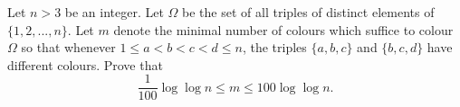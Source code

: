 \documentclass{article}
\begin{document}
\setlength{\parindent}{0pt}
Let $n > 3$ be an integer. Let $\Omega$ be the set of all triples of distinct elements of $\{1, 2, . . . , n\}$. Let $m$ denote the minimal number of colours which suffice to colour $\Omega$ so that whenever $1 \leq a < b < c < d \leq n$, the triples $\{a, b, c\}$ and $\{b, c, d\}$ have different colours. Prove that \[\frac{1}{100}\log\log n\leq m \leq 100 \log \log n.\]
\end{document}
